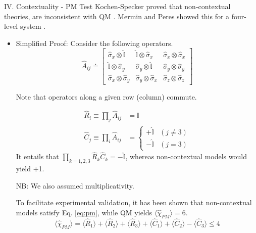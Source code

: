 \documentclass[final,hyperref={pdfpagelabels=false}]{beamer}
\newcommand{\mean}[1]{\langle #1 \rangle}
\begin{document}
\begin{frame}[t]
\begin{columns}[c]
\begin{column}{.69\textwidth}
\begin{columns}[c]
\begin{column}{.46\textwidth}
\begin{block}{IV. Contextuality - PM Test}
            Kochen-Specker proved that non-contextual theories, are inconsistent with QM \cite{Koc}. Mermin and Peres showed this for a four-level system \cite{PeresContext}.
            \begin{itemize}
            \item Simplified Proof: Consider the following operators. 
              \[
              \hat A_{ij} \doteq \left[
                \begin{array}{ccc}
                  \hat \sigma_x\otimes \mathbb {\hat I} &  \mathbb {\hat I} \otimes \hat \sigma_x & \hat \sigma_x\otimes \hat \sigma_ x \\
                  \mathbb {\hat I} \otimes \hat \sigma_y &  \hat \sigma_y \otimes \mathbb {\hat I} & \hat \sigma_y\otimes \hat \sigma_y \\
                  \hat \sigma_x \otimes \hat \sigma_y &  \hat \sigma_y \otimes \hat \sigma_x & \hat \sigma_z\otimes \hat \sigma_z
                \end{array} \right]
              \]


              Note that operators along a given row (column) commute. 
              
              \begin{align}
                \hat R_i\equiv \prod_j \hat A_{ij} & = \mathbb{I} \\
                \hat C_j\equiv \prod_i \hat A_{ij} & = 
                                           \begin{cases} 
                                             +\mathbb{\hat I} &  (j\neq 3)\\
                                             -\mathbb{\hat I} &  (j=3)
                                           \end{cases} 
              \end{align}
              It entails that $\prod_{k=1,2,3}\hat R_k \hat C_k= -\mathbb{\hat I}$, whereas non-contextual models would yield +1.

              NB: We also assumed multiplicativity. 

              To facilitate experimental validation, it has been shown that non-contextual models satisfy Eq. \ref{eq:pm}, while QM yields $\mean{\hat \chi_{PM}}=6$.
              \begin{equation}
                \mean{\hat \chi_{PM}} = \mean{\hat R_1} + \mean{\hat R_2} + \mean{\hat R_3} + \mean{\hat C_1} + \mean{\hat C_2} - \mean{\hat C_3} \le 4
                \label{eq:pm}
              \end{equation}


\end{itemize}
\end{block}
\end{column}
\end{columns}
\end{column}
\end{columns}
\end{frame}
\end{document}
